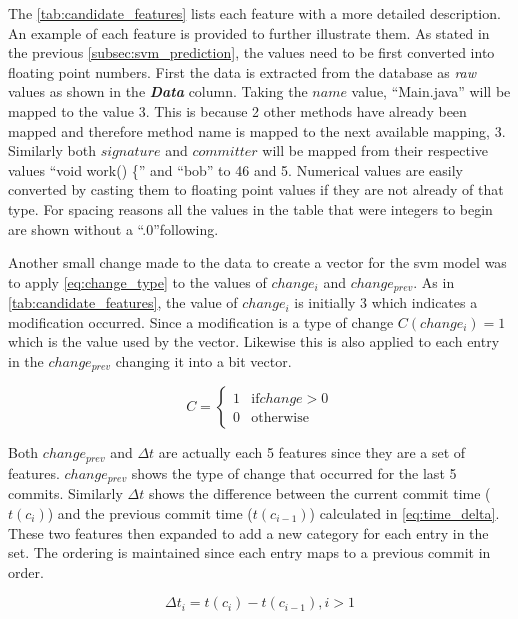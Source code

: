 The \autoref{tab:candidate_features} lists each feature with a more detailed description. An example of each feature is provided to further illustrate them. As stated in the previous \autoref{subsec:svm_prediction}, the values need to be first converted into floating point numbers. First the data is extracted from the database as \textit{raw} values as shown in the \textit{\textbf{Data}} column. Taking the $name$ value, ``Main.java'' will be mapped to the value 3. This is because 2 other methods have already been mapped and therefore method name is mapped to the next available mapping, 3. Similarly both $signature$ and $committer$ will be mapped from their respective values ``void work() \{'' and ``bob'' to 46 and 5. Numerical values are easily converted by casting them to floating point values if they are not already of that type. For spacing reasons all the values in the table that were integers to begin are shown without a ``.0''following.

Another small change made to the data to create a vector for the \gls{svm} model was to apply \autoref{eq:change_type} to the values of $change_i$ and $change_{prev}$. As in \autoref{tab:candidate_features}, the value of $change_i$ is initially 3 which indicates a modification occurred. Since a modification is a type of change $C(change_i) = 1$ which is the value used by the vector. Likewise this is also applied to each entry in the $change_{prev}$ changing it into a bit vector.

\begin{equation} 
\label{eq:change_type}
C = \left\{\begin{matrix}
1 & \text{if} change > 0 \\
0 & \text{otherwise}
\end{matrix}\right.
\end{equation}

Both $change_{prev}$ and $\Delta t$ are actually each 5 features since they are a set of features. $change_{prev}$ shows the type of change that occurred for the last 5 commits. Similarly $\Delta t$ shows the difference between the current commit time ($t(c_i)$) and the previous commit time ($t(c_{i-1})$) calculated in \autoref{eq:time_delta}. These two features then expanded to add a new category for each entry in the set. The ordering is maintained since each entry maps to a previous commit in order.

\begin{equation}
\label{eq:time_delta}
\Delta t_{i} = t(c_i) - t(c_{i-1}), i > 1
\end{equation}

